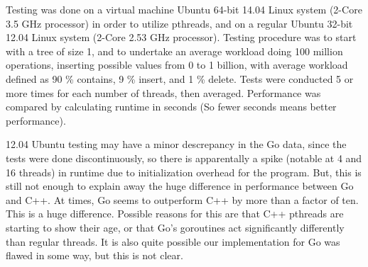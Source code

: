 \documentclass[finalreport,12pt]{elsarticle}
\begin{document}
   
   
   



Testing was done on a virtual machine Ubuntu 64-bit 14.04 Linux system (2-Core 3.5 GHz processor) in order to utilize pthreads, and on a regular Ubuntu 32-bit 12.04 Linux system (2-Core 2.53 GHz processor). Testing procedure was to start with a tree of size 1, and to undertake an average workload doing 100 million operations, inserting possible values from 0 to 1 billion, with average workload defined as 90 \% contains, 9 \% insert, and 1 \% delete. Tests were conducted 5 or more times for each number of threads, then averaged. Performance was compared by calculating runtime in seconds (So fewer seconds means better performance).

12.04 Ubuntu testing may have a minor descrepancy in the Go data, since the tests were done discontinuously, so there is apparentally a spike (notable at 4 and 16 threads) in runtime due to initialization overhead for the program. But, this is still not enough to explain away the huge difference in performance between Go and C++. At times, Go seems to outperform C++ by more than a factor of ten. This is a huge difference. Possible reasons for this are that C++ pthreads are starting to show their age, or that Go's goroutines act significantly differently than regular threads. It is also quite possible our implementation for Go was flawed in some way, but this is not clear. 
\end{document}
